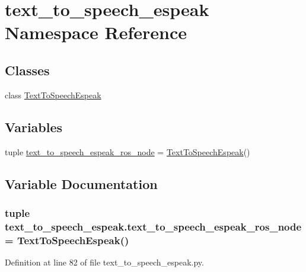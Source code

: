 \hypertarget{namespacetext__to__speech__espeak}{\section{text\-\_\-to\-\_\-speech\-\_\-espeak Namespace Reference}
\label{namespacetext__to__speech__espeak}
}
\subsection*{Classes}
\begin{DoxyCompactItemize}
\item 
class \hyperlink{classtext__to__speech__espeak_1_1TextToSpeechEspeak}{Text\-To\-Speech\-Espeak}
\end{DoxyCompactItemize}
\subsection*{Variables}
\begin{DoxyCompactItemize}
\item 
tuple \hyperlink{namespacetext__to__speech__espeak_a9bdb1306d820edf490e227c108cd1dfa}{text\-\_\-to\-\_\-speech\-\_\-espeak\-\_\-ros\-\_\-node} = \hyperlink{classtext__to__speech__espeak_1_1TextToSpeechEspeak}{Text\-To\-Speech\-Espeak}()
\end{DoxyCompactItemize}


\subsection{Variable Documentation}
\hypertarget{namespacetext__to__speech__espeak_a9bdb1306d820edf490e227c108cd1dfa}{
\subsubsection[{text\-\_\-to\-\_\-speech\-\_\-espeak\-\_\-ros\-\_\-node}]{\setlength{\rightskip}{0pt plus 5cm}tuple text\-\_\-to\-\_\-speech\-\_\-espeak.\-text\-\_\-to\-\_\-speech\-\_\-espeak\-\_\-ros\-\_\-node = {\bf Text\-To\-Speech\-Espeak}()}}\label{namespacetext__to__speech__espeak_a9bdb1306d820edf490e227c108cd1dfa}


Definition at line 82 of file text\-\_\-to\-\_\-speech\-\_\-espeak.\-py.

